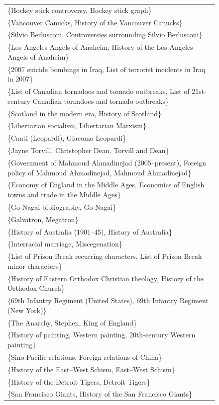 \documentclass{acm_proc_article-sp}
\begin{document}
\begin{figure}[hp!]
{\begin{tabular}{| l |}
\{Hockey stick controversy, Hockey stick graph\} \\
\{Vancouver Canucks, History of the Vancouver Canucks\} \\
\{Silvio Berlusconi, Controversies surrounding Silvio Berlusconi\} \\
\{Los Angeles Angels of Anaheim, History of the Los Angeles Angels of Anaheim\} \\
\{2007 suicide bombings in Iraq, List of terrorist incidents in Iraq in 2007\} \\
\{List of Canadian tornadoes and tornado outbreaks, List of 21st-century Canadian tornadoes and tornado outbreaks\} \\
\{Scotland in the modern era, History of Scotland\} \\
\{Libertarian socialism, Libertarian Marxism\} \\
\{Canti (Leopardi), Giacomo Leopardi\} \\
\{Jayne Torvill, Christopher Dean, Torvill and Dean\} \\
\{Government of Mahmoud Ahmadinejad (2005–present), Foreign policy of Mahmoud Ahmadinejad, Mahmoud Ahmadinejad\} \\
\{Economy of England in the Middle Ages, Economics of English towns and trade in the Middle Ages\} \\
\{Go Nagai bibliography, Go Nagai\} \\
\{Galvatron, Megatron\} \\
\{History of Australia (1901–45), History of Australia\} \\
\{Interracial marriage, Miscegenation\} \\
\{List of Prison Break recurring characters, List of Prison Break minor characters\} \\
\{History of Eastern Orthodox Christian theology, History of the Orthodox Church\} \\
\{69th Infantry Regiment (United States), 69th Infantry Regiment (New York)\} \\
\{The Anarchy, Stephen, King of England\} \\
\{History of painting, Western painting, 20th-century Western painting\} \\
\{Sino-Pacific relations, Foreign relations of China\} \\
\{History of the East–West Schism, East–West Schism\} \\
\{History of the Detroit Tigers, Detroit Tigers\} \\
\{San Francisco Giants, History of the San Francisco Giants\} \\

\end{tabular}}
\end{figure}
\end{document}
